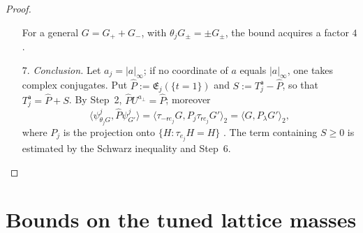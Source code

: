 \documentclass[11pt,letterpaper,reqno]{amsart}
\theoremstyle{definition}
\begin{document}
\begin{proof}
\begin{enumerate}
For a general $G=G_++G_-$, with $\theta_jG_\pm=\pm G_\pm$, the bound acquires a factor $4$ \cite[Lemma~12.38]{QEDII}.
\item[7.] \emph{Conclusion.}
Let $a_j=|a|_\infty$; if no coordinate of $a$ equals $|a|_\infty$, one takes complex conjugates.
Put $\hat P:=\mathfrak E_j(\{t=1\})$ and $S:=T_j^{\mathsf a}-\hat P$, so that $T_j^{\mathsf a}=\hat P+S$.
By Step~2, $\hat PU^{a_\perp}=\hat P$; moreover
\begin{equation*}
\bigl\langle\psi^j_{\theta_jG},\hat P\psi^j_{G'}\bigr\rangle=\bigl\langle\tau_{-\mathsf re_j}G,P_j\tau_{\mathsf re_j}G'\bigr\rangle_2=\langle G,P_\lambda G'\rangle_2,
\end{equation*}
where $P_j$ is the projection onto $\{H:\tau_{e_j}H=H\}$ \cite[proof of Theorem~10.12\,(c), Step~1; Theorem~10.12\,(c)]{QEDII}.
The term containing $S\ge0$ is estimated by the Schwarz inequality and Step~6.
\end{enumerate}
\end{proof}


\section{Bounds on the tuned lattice masses}
\end{document}

